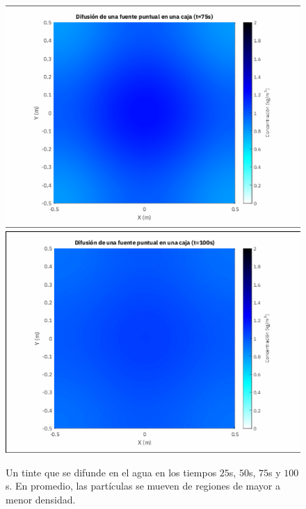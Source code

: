 \begin{figure}[ht!]
	\includegraphics[width=.3\paperwidth]{E_IMAGENES/1_Capitulo2/75.png}\qquad
	\includegraphics[width=.3\paperwidth]{E_IMAGENES/1_Capitulo2/100.png}
	\caption[corto]{Un tinte que se difunde en el agua en los tiempos
		$25$s, $50$s, $75$s y $100$s.
		En promedio, las partículas se mueven de regiones de mayor a menor densidad.}
\end{figure}

